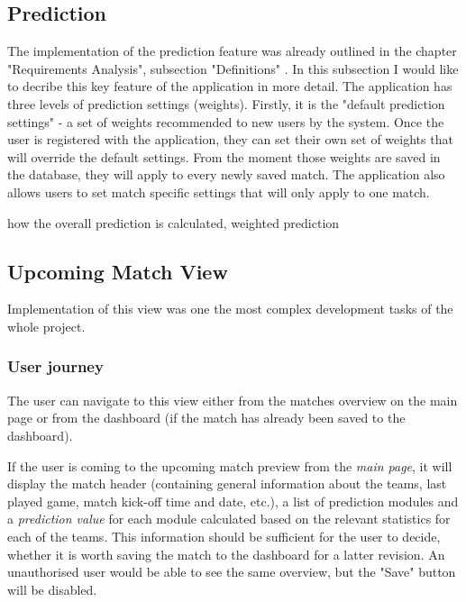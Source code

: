 \subsection{Prediction}
The implementation of the prediction feature was already outlined in the chapter "Requirements Analysis", subsection "Definitions" \cite{subsec:definitions}. In this subsection I would like to decribe this key feature of the application in more detail. The application has three levels of prediction settings (weights). Firstly, it is the "default prediction settings" - a set of weights recommended to new users by the system. Once the user is registered with the application, they can set their own set of weights that will override the default settings. From the moment those weights are saved in the database, they will apply to every newly saved match. The application also allows users to set match specific settings that will only apply to one match. 
 


how the overall prediction is calculated, weighted prediction

\subsection{Upcoming Match View}
\label{subsec:implementupcomingmatchview}
Implementation of this view was one the most complex development tasks of the whole project.

\subsubsection{User journey}
\label{subsec:upcomingmatchviewuserjourney}
The user can navigate to this view either from the matches overview on the main page or from the dashboard (if the match has already been saved to the dashboard).

 If the user is coming to the upcoming match preview from the \emph{main page}, it will display the match header (containing general information about the teams, last played game, match kick-off time and date, etc.), a list of prediction modules and a \emph{prediction value} for each module calculated based on the relevant statistics for each of the teams. This information should be sufficient for the user to decide, whether it is worth saving the match to the dashboard for a latter revision. An unauthorised user would be able to see the same overview, but the "Save" button will be disabled. 

